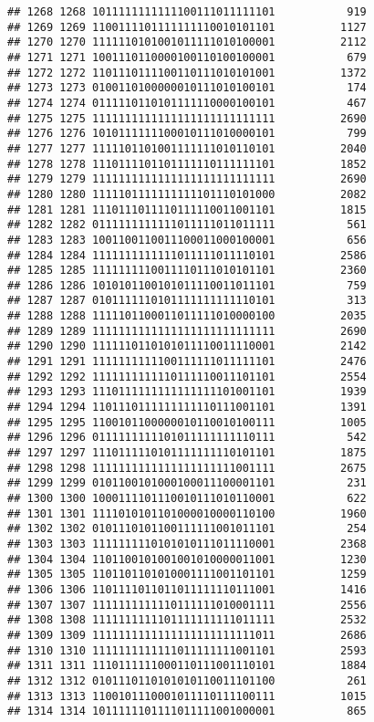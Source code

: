\documentclass[]{article}
\begin{document}
\begin{verbatim}
## 1268 1268 1011111111111100111011111101           919
## 1269 1269 1100111101111111110010101101          1127
## 1270 1270 1111110101001011111010100001          2112
## 1271 1271 1001110110000100110100100001           679
## 1272 1272 1101110111100110111010101001          1372
## 1273 1273 0100110100000010111010100101           174
## 1274 1274 0111110110101111110000100101           467
## 1275 1275 1111111111111111111111111111          2690
## 1276 1276 1010111111100010111010000101           799
## 1277 1277 1111101101001111111010110101          2040
## 1278 1278 1110111101101111110111111101          1852
## 1279 1279 1111111111111111111111111111          2690
## 1280 1280 1111101111111111101110101000          2082
## 1281 1281 1110111011110111110011001101          1815
## 1282 1282 0111111111111011111011011111           561
## 1283 1283 1001100110011100011000100001           656
## 1284 1284 1111111111111011111011110101          2586
## 1285 1285 1111111110011110111010101101          2360
## 1286 1286 1010101100101011110011011101           759
## 1287 1287 0101111110101111111111110101           313
## 1288 1288 1111101100011011111010000100          2035
## 1289 1289 1111111111111111111111111111          2690
## 1290 1290 1111110110101011110011110001          2142
## 1291 1291 1111111111100111111011111101          2476
## 1292 1292 1111111111110111110011101101          2554
## 1293 1293 1110111111111111111101001101          1939
## 1294 1294 1101110111111111110111001101          1391
## 1295 1295 1100101100000010110010100111          1005
## 1296 1296 0111111111101011111111110111           542
## 1297 1297 1110111110101111111110101101          1875
## 1298 1298 1111111111111111111111001111          2675
## 1299 1299 0101100101000100011100001101           231
## 1300 1300 1000111101110010111010110001           622
## 1301 1301 1111010101101000010000110100          1960
## 1302 1302 0101110101100111111001011101           254
## 1303 1303 1111111110101010111011110001          2368
## 1304 1304 1101100101001001010000011001          1230
## 1305 1305 1101101101010001111001101101          1259
## 1306 1306 1101111011011011111110111001          1416
## 1307 1307 1111111111110111111010001111          2556
## 1308 1308 1111111111101111111111011111          2532
## 1309 1309 1111111111111111111111111011          2686
## 1310 1310 1111111111111011111111001101          2593
## 1311 1311 1110111111000110111001110101          1884
## 1312 1312 0101110110101010110011101100           261
## 1313 1313 1100101110001011110111100111          1015
## 1314 1314 1011111101111011111001000001           865

\end{verbatim}
\end{document}
